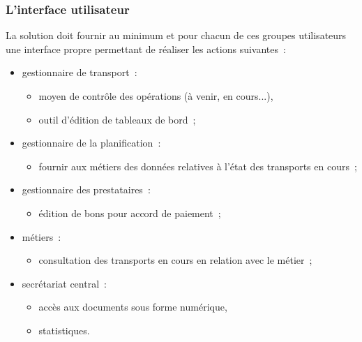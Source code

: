 \subsubsection{L'interface utilisateur}
La solution doit fournir au minimum et pour chacun de ces groupes utilisateurs une interface propre permettant de réaliser les actions suivantes~:
\begin{itemize}
	\item gestionnaire de transport~:
	\begin{itemize}
		\item moyen de contrôle des opérations (à venir, en cours...),
		\item outil d'édition de tableaux de bord~;
	\end{itemize}
	\item gestionnaire de la planification~:
	\begin{itemize}
		\item fournir aux métiers des données relatives à l'état des transports en cours~;
	\end{itemize}
	\item gestionnaire des prestataires~:
	\begin{itemize}
		\item édition de bons pour accord de paiement~;
	\end{itemize}
	\item métiers~:
	\begin{itemize}
		\item consultation des transports en cours en relation avec le métier~;
	\end{itemize}
	\item secrétariat central~:
	\begin{itemize}
		\item accès aux documents sous forme numérique,
		\item statistiques.
	\end{itemize}
\end{itemize}

